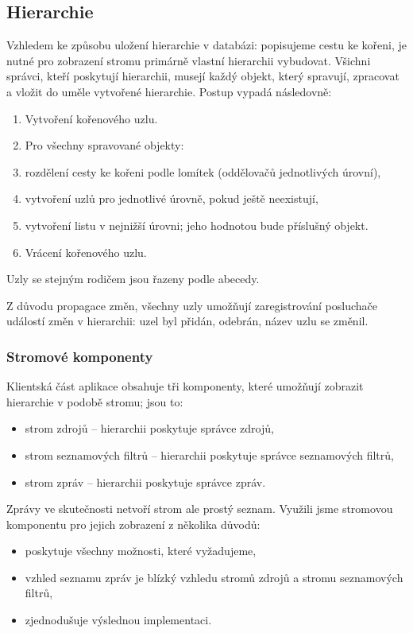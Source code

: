\subsection{Hierarchie}

Vzhledem ke způsobu uložení hierarchie v databázi: popisujeme cestu ke kořeni, je nutné pro zobrazení stromu primárně vlastní hierarchii vybudovat.
Všichni správci, kteří poskytují hierarchii, musejí každý objekt, který spravují, zpracovat a vložit do uměle vytvořené hierarchie.
Postup vypadá následovně:
\begin{enumerate}
	\item Vytvoření kořenového uzlu.
	\item Pro všechny spravované objekty:
	\item rozdělení cesty ke kořeni podle lomítek (oddělovačů jednotlivých úrovní),
	\item vytvoření uzlů pro jednotlivé úrovně, pokud ještě neexistují,
	\item vytvoření listu v nejnižší úrovni; jeho hodnotou bude příslušný objekt.
	\item Vrácení kořenového uzlu.
\end{enumerate}

Uzly se stejným rodičem jsou řazeny podle abecedy.

Z důvodu propagace změn, všechny uzly umožňují zaregistrování posluchače událostí změn v hierarchii: uzel byl přidán, odebrán, název uzlu se změnil.

\subsubsection{Stromové komponenty}

Klientská část aplikace obsahuje tři komponenty, které umožňují zobrazit hierarchie v podobě stromu; jsou to:
\begin{itemize}
	\item strom zdrojů -- hierarchii poskytuje správce zdrojů,
	\item strom seznamových filtrů -- hierarchii poskytuje správce seznamových filtrů,
	\item strom zpráv -- hierarchii poskytuje správce zpráv.
\end{itemize}

Zprávy ve skutečnosti netvoří strom ale prostý seznam.
Využili jsme stromovou komponentu pro jejich zobrazení z několika důvodů:
\begin{itemize}
	\item poskytuje všechny možnosti, které vyžadujeme,
	\item vzhled seznamu zpráv je blízký vzhledu stromů zdrojů a stromu seznamových filtrů,
	\item zjednodušuje výslednou implementaci.
\end{itemize}

